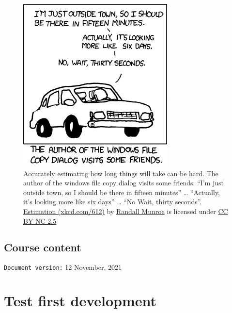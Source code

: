 \documentclass[
]{book}
\begin{document}
\begin{figure}

{\centering \includegraphics[width=0.75\linewidth]{images/xkcd-estimation} 

}

\caption{Accurately estimating how long things will take can be hard. The author of the windows file copy dialog visits some friends: ``I'm just outside town, so I should be there in fifteen minutes'' \ldots{} ``Actually, it's looking more like six days'' \ldots{} ``No Wait, thirty seconds''. \href{https://xkcd.com/612/}{Estimation (xkcd.com/612)} by \href{https://en.wikipedia.org/wiki/Randall_Munroe}{Randall Munroe} is licensed under \href{https://creativecommons.org/licenses/by-nc/2.5/}{CC BY-NC 2.5}}\label{fig:xkcd-estimation-fig}
\end{figure}



\hypertarget{course-content}{%
\section{Course content}\label{course-content}}

\texttt{Document\ version:} 12 November, 2021

\hypertarget{testing}{%
\chapter{Test first development}\label{testing}}
\end{document}
